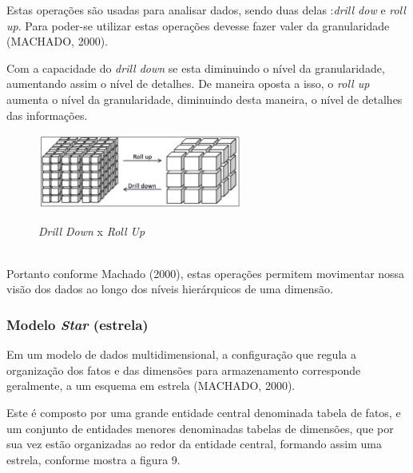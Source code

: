 Estas operações são usadas para analisar dados, sendo duas delas
:\textit{drill dow} e \textit{roll up}. Para poder-se utilizar estas operações devesse fazer valer da granularidade (MACHADO, 2000).

Com a capacidade do \textit{drill down} se esta diminuindo o nível da granularidade, aumentando assim o nível de detalhes. De maneira oposta a isso, 
o \textit{roll up} aumenta o nível da granularidade, diminuindo desta maneira, o nível de detalhes das informações.

\begin{figure}[H]
	\vspace*{0,2cm}
    \centering
    \caption{\textit{Drill Down} x  \textit{Roll Up}}
    \includegraphics[width=0.6\textwidth]{./04-figuras/figura-08}
    \label{fig:ilustfig08}
\end{figure}
\vspace*{-0,9cm}
{\raggedright {}}\\

Portanto conforme Machado (2000), estas operações permitem movimentar nossa visão dos dados ao longo dos níveis hierárquicos de uma dimensão.

\subsubsection{Modelo \textit{Star} (estrela)}

Em um modelo de dados multidimensional, a configuração que regula a organização dos fatos e das dimensões para armazenamento corresponde geralmente, a um esquema em estrela (MACHADO, 2000).

Este é composto por uma grande entidade central denominada tabela de fatos, e um conjunto de entidades menores denominadas tabelas de dimensões, que por sua vez estão organizadas ao redor da entidade central, formando assim uma estrela, conforme mostra a figura 9.

